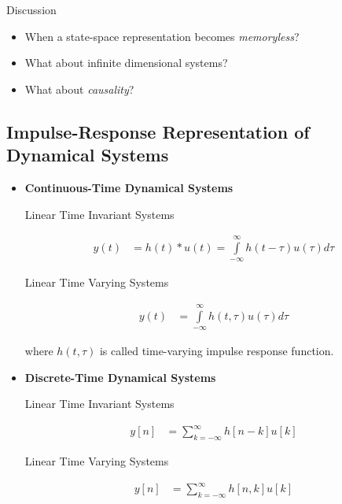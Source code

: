\documentclass[12pt,oneside]{amsart}
\begin{document}
\vspace{12pt}

Discussion 

\vspace{6pt}

\begin{itemize}
  \item When a state-space representation becomes \textit{memoryless}?
  \item What about infinite dimensional systems?
  \item What about \textit{causality}?    
\end{itemize}

\vspace{12pt}

\subsection{Impulse-Response Representation of Dynamical Systems}

\begin{itemize}

\item \textbf{Continuous-Time Dynamical Systems}

Linear Time Invariant Systems

\begin{align*}
  y(t) &= h(t) \ast u(t) = \int\limits_{-\infty}^{\infty} h(t-\tau) u(\tau) d\tau 
\end{align*}

Linear Time Varying Systems

\begin{align*}
  y(t) &= \int\limits_{-\infty}^{\infty} h(t,\tau) u(\tau) d\tau 
\end{align*}

\noindent where $h(t,\tau)$ is called time-varying impulse response
function.


\vspace{12pt}

\item \textbf{Discrete-Time Dynamical Systems}

Linear Time Invariant Systems

\begin{align*}
  y[n] &= \sum\limits_{k = -\infty}^{\infty} h[n -k] u[k] 
\end{align*}

Linear Time Varying Systems

\begin{align*}
  y[n] &= \sum\limits_{k = -\infty}^{\infty} h[n,k] u[k] 
\end{align*}

\vspace{12pt}

\end{itemize}
\end{document}
